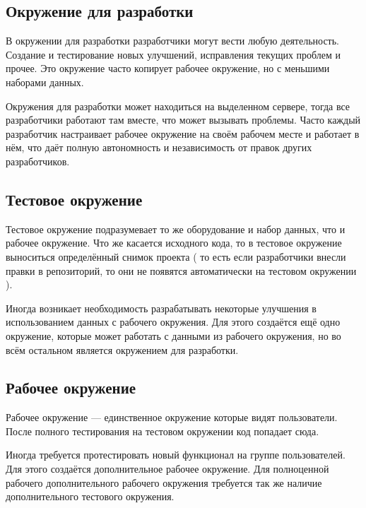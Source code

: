 
\subsection{ Окружение для разработки } \label{sect3_9_1}

В окружении для разработки разработчики могут вести любую деятельность. Создание и тестирование новых улучшений, исправления текущих проблем и прочее. Это окружение часто копирует рабочее окружение, но с меньшими наборами данных.

Окружения для разработки может находиться на выделенном сервере, тогда все разработчики работают там вместе, что может вызывать проблемы. Часто каждый разработчик настраивает рабочее окружение на своём рабочем месте и работает в нём, что даёт полную автономность и независимость от правок других разработчиков.


\subsection{ Тестовое окружение } \label{sect3_9_2}

Тестовое окружение подразумевает то же оборудование и набор данных, что и рабочее окружение. Что же касается исходного кода, то в тестовое окружение выноситься определённый снимок проекта ( то есть если разработчики внесли правки в репозиторий, то они не появятся автоматически на тестовом окружении ).

Иногда возникает необходимость  разрабатывать некоторые улучшения в использованием данных с рабочего окружения. Для этого создаётся ещё одно окружение, которые может работать с данными из рабочего окружения, но во всём остальном является окружением для разработки.

\subsection{ Рабочее окружение } \label{sect3_9_3}

Рабочее окружение --- единственное окружение которые видят пользователи. После полного тестирования на тестовом окружении код попадает сюда.

Иногда требуется протестировать новый функционал на группе пользователей. Для этого создаётся дополнительное рабочее окружение. Для полноценной рабочего дополнительного рабочего окружения требуется так же наличие дополнительного тестового окружения.

